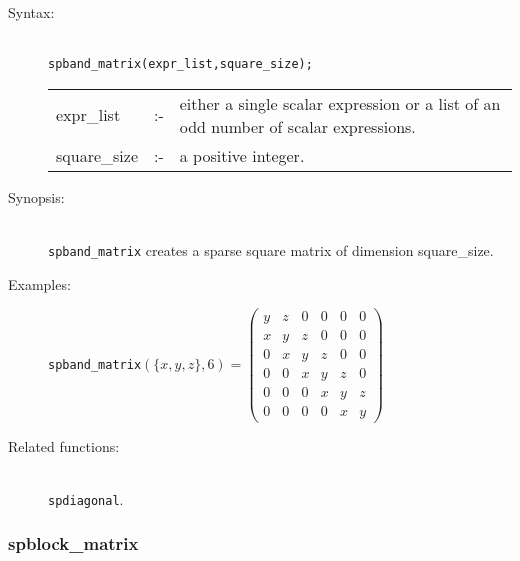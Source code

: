 \begin{description}
\item[Syntax:]\mbox{}\\
\texttt{spband\_matrix(expr\_list,square\_size);}\\[2mm]
\begin{tabular}{l l p{.72\linewidth}}
expr\_list  &:-&
either a single scalar expression or a list of an odd number of scalar
expressions.\\
square\_size &:-& a positive integer.
\end{tabular}

\item[Synopsis:]\mbox{}\\
                \texttt{spband\_matrix} creates a sparse square matrix of
                dimension square\_size.

\item[Examples:]
\begin{flushleft}
\texttt{spband\_matrix}\((\{x,y,z\},6) =
\begin{pmatrix} y & z & 0 & 0 & 0 & 0 \\ x & y & z & 0 & 0
& 0 \\ 0 & x & y & z & 0 & 0 \\ 0 & 0 & x & y & z & 0 \\ 0 & 0 & 0 & x &
 y & z \\ 0 & 0 & 0 & 0 & x & y
\end{pmatrix}
\)
\end{flushleft}

\item[Related functions:]\mbox{}\\
 \texttt{spdiagonal}.
\end{description}

\subsubsection{spblock\_matrix}
\label{sparse:spblock_matrix}

